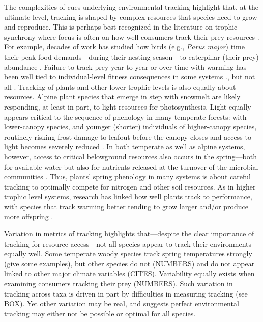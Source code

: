 \documentclass[11pt,letterpaper]{article}
\begin{document}
The complexities of cues underlying environmental tracking highlight that, at the ultimate level, tracking is shaped by complex resources that species need to grow and reproduce. This is perhaps best recognized in the literature on trophic synchrony where focus is often on how well consumers track their prey resources \citep{deacy2018, kharouba2018}. For example, decades of work has studied how birds (e.g., \emph{Parus major}) time their peak food demands---during their nesting season---to caterpillar (their prey) abundance \citep[e.g.,][]{charm2008}. Failure to track prey year-to-year or over time with warming has been well tied to individual-level fitness consequences in some systems \citep[e.g.,][]{charm2008}., but not all \citep{visser2006}. Tracking of plants and other lower trophic levels is also equally about resources. Alpine plant species that emerge in step with snowmelt are likely responding, at least in part, to light resources for photosynthesis. Light equally appears critical to the sequence of phenology in many temperate forests: with lower-canopy species, and younger (shorter) individuals of higher-canopy species, routinely risking frost damage to leafout before the canopy closes and access to light becomes severely reduced \citep{Vitasse2013,heberling2019}. In both temperate as well as alpine systems, however, access to critical belowground resources also occurs in the spring---both for available water but also for nutrients released at the turnover of the microbial communities \citep{Zak:1990ar}. Thus, plants' spring phenology in many systems is about careful tracking to optimally compete for nitrogen and other soil resources. As in higher trophic level systems, research has linked how well plants track to performance, with species that track warming better tending to grow larger and/or produce more offspring \citep{Cleland:2012}.

Variation in metrics of tracking highlights that---despite the clear importance of tracking for resource access---not all species appear to track their environments equally well. Some temperate woody species track spring temperatures strongly (give some examples), but other species do not (NUMBERS) and do not appear linked to other major climate variables (CITES). Variability equally exists when examining consumers tracking their prey (NUMBERS). Such variation in tracking across taxa is driven in part by difficulties in measuring tracking (see BOX). Yet other variation may be real, and suggests perfect environmental tracking may either not be possible or optimal for all species. 
\end{document}
